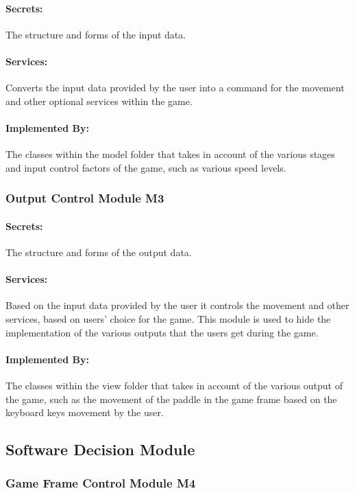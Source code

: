 \documentclass[12pt,letterpaper]{article}
\begin{document}
	\paragraph{Secrets: } The structure and forms of the input data.
	\paragraph{Services: } Converts the input data provided by the user into a command for the movement and other optional services within the game. 
	\paragraph{Implemented By: } The classes within the model folder that takes in account of the various stages and input control factors of the game, such as various speed levels.

	\subsubsection{Output Control Module M3}
	\paragraph{Secrets: } The structure and forms of the output data.
	\paragraph{Services: } Based on the input data provided by the user it controls the movement and other services, based on users’ choice for the game. This module is used to hide the implementation of the various outputs that the users get during the game. 
	\paragraph{Implemented By: } The classes within the view folder that takes in account of the various output of the game, such as the movement of the paddle in the game frame based on the keyboard keys movement by the user. 

	
	\subsection{Software Decision Module}

	\subsubsection{Game Frame Control Module M4}
\end{document}
